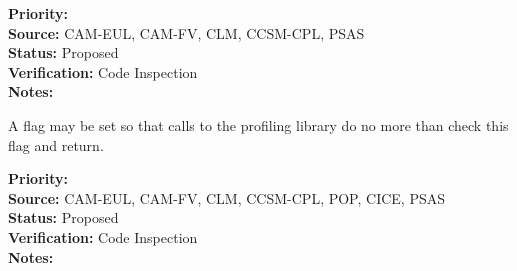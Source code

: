 \begin{reqlist}
{\bf Priority:}  \\
{\bf Source:} CAM-EUL, CAM-FV, CLM, CCSM-CPL, PSAS \\
{\bf Status:} Proposed \\
{\bf Verification:} Code Inspection \\
{\bf Notes:} 
\end{reqlist}


A flag may be set so that calls to the profiling library do no more than check
this flag and return.

\begin{reqlist}
{\bf Priority:}  \\
{\bf Source:} CAM-EUL, CAM-FV, CLM, CCSM-CPL, POP, CICE, PSAS \\
{\bf Status:} Proposed \\
{\bf Verification:} Code Inspection \\
{\bf Notes:} 
\end{reqlist}

